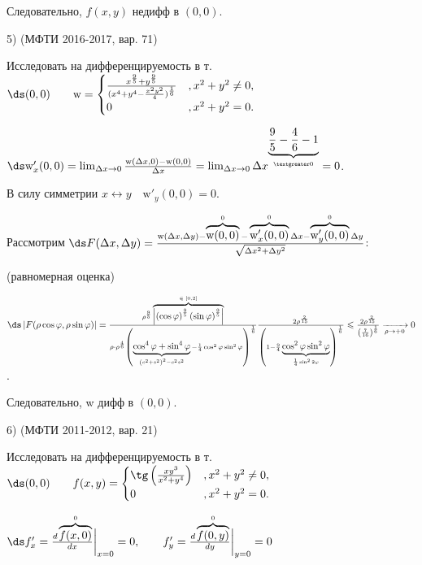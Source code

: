 Следовательно, \; $f(x,y)$ \; недифф в $(0,0)$.

\bigskip

5) (МФТИ 2016-2017, вар. 71)

\smallskip

Исследовать на дифференцируемость в т. $\ds (0,0) \qquad \text{w} = \begin{cases}
  \frac{x^{\frac{9}{5}} + y^{\frac{9}{5}}}{(x^4 + y^4 - \frac{x^2y^2}{4})^{\frac{1}{6}}}  &, x^2+y^2\neq0,   \\
  0 &, x^2+y^2=0.
\end{cases}$

$\ds \text{w}'_x(0,0) = \lim_{\Delta x \to 0}{\frac{\text{w}(\Delta x,0) - \text{w}(0,0)}{\Delta x}} = \lim_{\Delta x \to 0}{\Delta x^{\underbrace{\frac{9}{5}-\frac{4}{6}-1}_{\textgreater0}}} = 0$.

В силу симметрии \; $x\leftrightarrow y \quad \text{w}'_y(0,0)=0$.

Рассмотрим $\ds F(\Delta x,\Delta y) = \frac{\text{w}(\Delta x,\Delta y) - \overbrace{\text{w}(0,0)}^0 - \overbrace{\text{w}'_x(0,0)}^0\Delta x - \overbrace{\text{w}'_y(0,0)}^0\Delta y}{\sqrt{\Delta x^2 + \Delta y^2}}$:

(равномерная оценка)

$\ds \left|F(\rho\cos\varphi,\rho\sin\varphi)\right| = \frac{\rho^{\frac{9}{5}}\overbrace{\left|\left(\cos\varphi\right)^{\frac{9}{5}}\left(\sin\varphi\right)^{\frac{9}{5}}\right|}^{\in \; [0,2]}}{\rho\cdot\rho^{\frac{4}{6}}\left(\underbrace{\cos^4\varphi+\sin^4\varphi}_{\left(c^2+s^2\right)^2-c^2s^2} - \frac{1}{4}\cos^2\varphi\sin^2\varphi\right)^{\frac{1}{6}}}   \frac{2\rho^{\frac{2}{15}}}{\left(1 -\frac{9}{4}\underbrace{\cos^2\varphi\sin^2\varphi}_{\frac{1}{4}\sin^22\varphi}\right)^{\frac{1}{6}}} \leqslant \frac{2\rho^{\frac{2}{15}}}{\left(\frac{7}{16}\right)^{\frac{1}{6}}} \xrightarrow[\rho \to +0]{} 0$.

Следовательно, \; w \; дифф в $(0,0)$.

\bigskip

6) (МФТИ 2011-2012, вар. 21)

Исследовать на дифференцируемость в т. $\ds (0,0) \qquad f(x,y) = \begin{cases}
  \tg\left(\frac{xy^3}{x^2+y^4}\right)  &, x^2+y^2\neq0,   \\
  0 &, x^2+y^2=0.
\end{cases}$

$\ds f'_x = \frac{d\overbrace{f(x,0)}^0}{dx}\bigg|_{x=0} = 0, \qquad f'_y = \frac{d\overbrace{f(0,y)}^0}{dy}\bigg|_{y=0} = 0$

